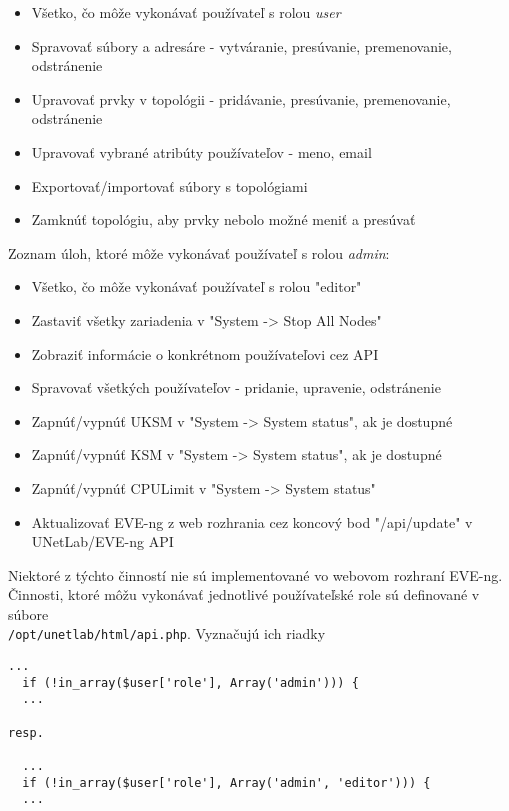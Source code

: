 \begin{itemize}[noitemsep]
    \item Všetko, čo môže vykonávať používateľ s rolou \emph{user}
    \item Spravovať súbory a adresáre - vytváranie, presúvanie, premenovanie, odstránenie
    \item Upravovať prvky v topológii - pridávanie, presúvanie, premenovanie, odstránenie
    \item Upravovať vybrané atribúty používateľov - meno, email
    \item Exportovať/importovať súbory s topológiami
    \item Zamknúť topológiu, aby prvky nebolo možné meniť a presúvať
\end{itemize}

\noindent
Zoznam úloh, ktoré môže vykonávať používateľ s rolou \emph{admin}:

\begin{itemize}[noitemsep]
    \item Všetko, čo môže vykonávať používateľ s rolou "editor"
    \item Zastaviť všetky zariadenia v "System -> Stop All Nodes"
    \item Zobraziť informácie o konkrétnom používateľovi cez API
    \item Spravovať všetkých používateľov - pridanie, upravenie, odstránenie
    \item Zapnúť/vypnúť UKSM v "System -> System status", ak je dostupné
    \item Zapnúť/vypnúť KSM v "System -> System status", ak je dostupné
    \item Zapnúť/vypnúť CPULimit v "System -> System status"
    \item Aktualizovať EVE-ng z web rozhrania cez koncový bod "/api/update" v UNetLab/EVE-ng API
\end{itemize}

Niektoré z týchto činností nie sú implementované vo webovom rozhraní EVE-ng. Činnosti, ktoré môžu vykonávať jednotlivé používateľské role sú definované v súbore \\
\texttt{/opt/unetlab/html/api.php}. Vyznačujú ich riadky

\renewcommand\baselinestretch{1}
\begin{Verbatim}[samepage=true]
  ...
  if (!in_array($user['role'], Array('admin'))) {
  ...

resp.

  ...
  if (!in_array($user['role'], Array('admin', 'editor'))) {
  ...
\end{Verbatim}
\renewcommand\baselinestretch{1.5}

